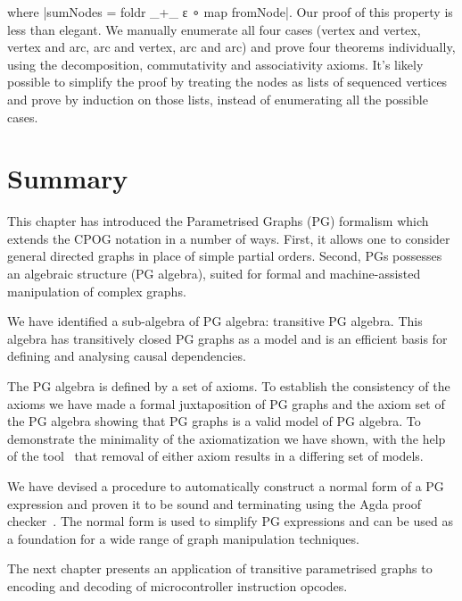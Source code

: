where |sumNodes = foldr _+_ ε ∘ map fromNode|. Our proof of this property is less than elegant. We manually enumerate all four cases (vertex and vertex, vertex and arc, arc and vertex, arc and arc) and prove four theorems individually, using the decomposition, commutativity and associativity axioms. It's likely possible to simplify the proof by treating the nodes as lists of sequenced vertices and prove by induction on those lists, instead of enumerating all the possible cases.


\section{Summary}

This chapter has introduced the Parametrised Graphs (PG) formalism which extends the CPOG notation in a number of ways.
First, it allows one to consider general directed graphs in place of simple partial orders. Second,
PGs possesses an algebraic structure (PG algebra), suited for formal and machine-assisted manipulation of 
complex graphs.  

We have identified a sub-algebra of PG algebra: transitive PG algebra. This algebra has transitively closed PG graphs as a model and is an efficient basis for defining and analysing causal dependencies.  

The PG algebra is defined by a set of axioms. To establish the consistency of the axioms we have made a formal juxtaposition of PG graphs and the axiom set of the PG algebra showing that PG graphs is a valid model of PG algebra. To demonstrate the minimality of the axiomatization we have shown, with the help of the  tool~\cite{2011_bizjak_alg} that removal of either axiom results in a differing set of models. 

We have devised a procedure to automatically construct a normal form of a PG expression and proven it to be sound and terminating using the Agda proof checker~\cite{norell:thesis}. The normal form is used to simplify PG expressions and can be used as a foundation for a wide range of graph manipulation techniques. 

The next chapter presents an application of transitive parametrised graphs to encoding and decoding of microcontroller instruction opcodes.

